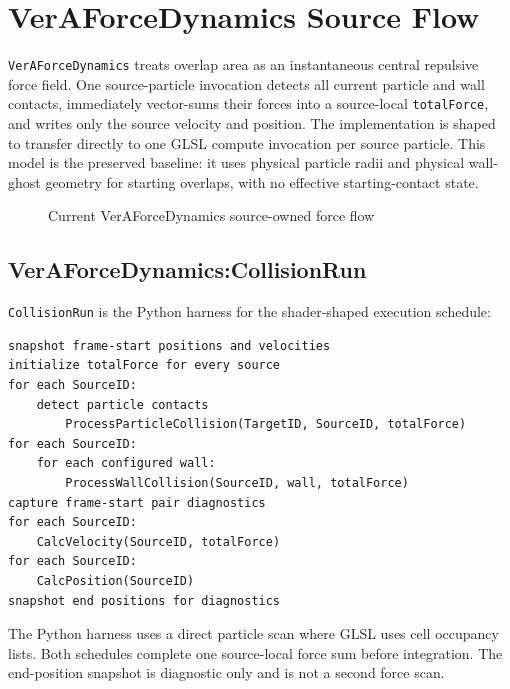 ﻿%
\newpage
\section{VerAForceDynamics Source Flow}

\newcommand{\VerAForceFunctionSection}[1]{%
  \subsection{VerAForceDynamics:#1}%
  \label{vera-force:#1}%
}

\texttt{VerAForceDynamics} treats overlap area as an instantaneous central
repulsive force field.  One source-particle invocation detects all current
particle and wall contacts, immediately vector-sums their forces into a
source-local \texttt{totalForce}, and writes only the source velocity and
position.  The implementation is shaped to transfer directly to one GLSL
compute invocation per source particle.  This model is the preserved
baseline: it uses physical particle radii and physical wall-ghost geometry for
starting overlaps, with no effective starting-contact state.

\begin{figure}[ht]
\centering
\resizebox{\textwidth}{!}{}
\caption{Current VerAForceDynamics source-owned force flow}
\end{figure}

\clearpage

\VerAForceFunctionSection{CollisionRun}

\texttt{CollisionRun} is the Python harness for the shader-shaped execution
schedule:

\begin{verbatim}
snapshot frame-start positions and velocities
initialize totalForce for every source
for each SourceID:
    detect particle contacts
        ProcessParticleCollision(TargetID, SourceID, totalForce)
for each SourceID:
    for each configured wall:
        ProcessWallCollision(SourceID, wall, totalForce)
capture frame-start pair diagnostics
for each SourceID:
    CalcVelocity(SourceID, totalForce)
for each SourceID:
    CalcPosition(SourceID)
snapshot end positions for diagnostics
\end{verbatim}

The Python harness uses a direct particle scan where GLSL uses cell occupancy
lists.  Both schedules complete one source-local force sum before integration.
The end-position snapshot is diagnostic only and is not a second force scan.

